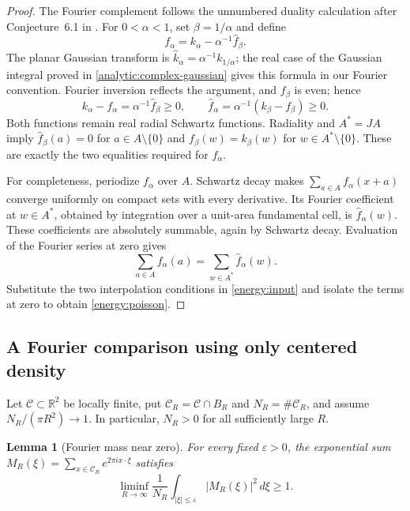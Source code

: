 \documentclass[11pt]{article}
\newtheorem{lemma}[theorem]{Lemma}
\theoremstyle{remark}\newtheorem{remark}[theorem]{Remark}
\begin{document}
\begin{proof}
The Fourier complement follows the unnumbered duality calculation after
Conjecture~6.1 in \cite[Section~6, p.~19]{CohnMiller2016}.
For $0<\alpha<1$, set $\beta=1/\alpha$ and define
\[
 f_\alpha=k_\alpha-\alpha^{-1}\widehat f_\beta.
\]
The planar Gaussian transform is
$\widehat k_\alpha=\alpha^{-1}k_{1/\alpha}$; the real case of the
Gaussian integral proved in \eqref{analytic:complex-gaussian} gives this
formula in our Fourier convention.
Fourier inversion reflects the argument, and $f_\beta$ is even; hence
\[
 k_\alpha-f_\alpha=\alpha^{-1}\widehat f_\beta\ge0,
 \qquad
 \widehat f_\alpha=\alpha^{-1}(k_\beta-f_\beta)\ge0.
\]
Both functions remain real radial Schwartz functions.
Radiality and $A^*=JA$ imply
$\widehat f_\beta(a)=0$ for $a\in A\setminus\{0\}$ and
$f_\beta(w)=k_\beta(w)$ for $w\in A^*\setminus\{0\}$.
These are exactly the two equalities required for $f_\alpha$.

For completeness, periodize $f_\alpha$ over $A$.
Schwartz decay makes $\sum_{a\in A}f_\alpha(x+a)$ converge uniformly
on compact sets with every derivative. Its Fourier coefficient at
$w\in A^*$, obtained by integration over a unit-area fundamental cell,
is $\widehat f_\alpha(w)$.
These coefficients are absolutely summable, again by Schwartz decay.
Evaluation of the Fourier series at zero gives
\[
 \sum_{a\in A}f_\alpha(a)=\sum_{w\in A^*}\widehat f_\alpha(w).
\]
Substitute the two interpolation conditions in \eqref{energy:input}
and isolate the terms at zero to obtain \eqref{energy:poisson}.
\end{proof}

\subsection{A Fourier comparison using only centered density}

Let $\mathcal C\subset\mathbb R^2$ be locally finite, put
$\mathcal C_R=\mathcal C\cap B_R$ and $N_R=\#\mathcal C_R$, and assume
$N_R/(\pi R^2)\to1$.
In particular, $N_R>0$ for all sufficiently large $R$.

\begin{lemma}[Fourier mass near zero]
\label{energy:low-frequency}
For every fixed $\varepsilon>0$, the exponential sum
$M_R(\xi)=\sum_{x\in\mathcal C_R}e^{2\pi i x\cdot\xi}$ satisfies
\begin{equation}
 \liminf_{R\to\infty}\frac1{N_R}
 \int_{|\xi|\le\varepsilon}|M_R(\xi)|^2\,d\xi\ge1.
 \label{energy:fourier-mass}
\end{equation}
\end{lemma}
\end{document}
